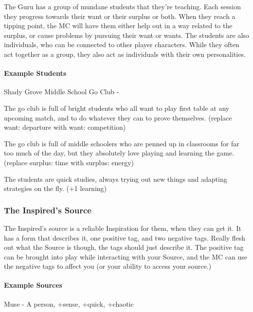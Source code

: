 \documentclass[10pt,twoside,openright]{memoir}
\begin{document}
The Guru has a group of mundane students that they're teaching. Each
session they progress towards their want or their surplus or both. When
they reach a tipping point, the MC will have them either help out in a
way related to the surplus, or cause problems by pursuing their want or
wants. The students are also individuals, who can be connected to other
player characters. While they often act together as a group, they also
act as individuals with their own personalities.

\hypertarget{example-students}{%
\paragraph{Example Students}\label{example-students}}

Shady Grove Middle School Go Club -

The go club is full of bright students who all want to play first table
at any upcoming match, and to do whatever they can to prove themselves.
(replace want: departure with want: competition)

The go club is full of middle schoolers who are penned up in classrooms
for far too much of the day, but they absolutely love playing and
learning the game. (replace surplus: time with surplus: energy)

The students are quick studies, always trying out new things and
adapting strategies on the fly. (+1 learning)

\hypertarget{the-inspireds-source}{%
\subsubsection{The Inspired's Source}\label{the-inspireds-source}}

The Inspired's source is a reliable Inspiration for them, when they can
get it. It has a form that describes it, one positive tag, and two
negative tags. Really flesh out what the Source is though, the tags
should just describe it. The positive tag can be brought into play while
interacting with your Source, and the MC can use the negative tags to
affect you (or your ability to access your source.)

\hypertarget{example-sources}{%
\paragraph{Example Sources}\label{example-sources}}

Muse - A person, +sense, +quick, +chaotic
\end{document}
